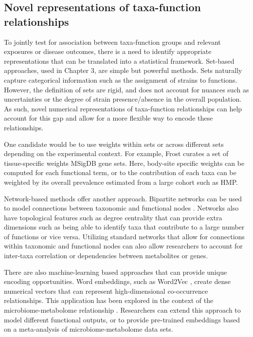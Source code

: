 \subsection{Novel representations of taxa-function relationships}

To jointly test for association between taxa-function groups and relevant exposures or disease outcomes, there is a need to identify appropriate representations that can be translated into a statistical framework. Set-based approaches, used in Chapter 3, are simple but powerful methods. Sets naturally capture categorical information such as the assignment of strains to functions. However, the definition of sets are rigid, and does not account for nuances such as uncertainties or the degree of strain presence/absence in the overall population. As such, novel numerical representations of taxa-function relationships can help account for this gap and allow for a more flexible way to encode these relationships. 

One candidate would be to use weights within sets or across different sets depending on the experimental context. For example, Frost \cite{frost2018computation} curates a set of tissue-specific weights MSigDB gene sets. Here, body-site specific weights can be computed for each functional term, or to the contribution of each taxa can be weighted by its overall prevalence estimated from a large cohort such as HMP.  

Network-based methods offer another approach. Bipartite networks can be used to model connections between taxonomic and functional nodes \cite{tian2020decipheringa}. Networks also have topological features such as degree centrality that can provide extra dimensions such as being able to identify taxa that contribute to a large number of functions or vice versa. Utilizing standard networks that allow for connections within taxonomic and functional nodes can also allow researchers to account for inter-taxa correlation or dependencies between metabolites or genes. 

There are also machine-learning based approaches that can provide unique encoding opportunities. Word embeddings, such as Word2Vec \cite{mikolov2013efficient}, create dense numerical vectors that can represent high-dimensional co-occurrence relationships. This application has been explored in the context of the microbiome-metabolome relationship \cite{morton2019learning}. Researchers can extend this approach to model different functional outputs, or to provide pre-trained embeddings based on a meta-analysis of microbiome-metabolome data sets.  
